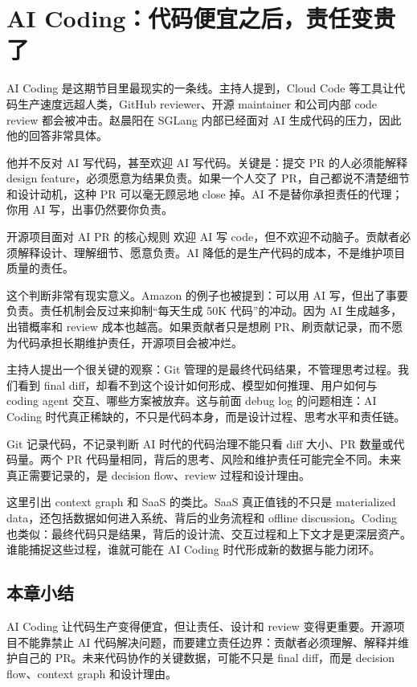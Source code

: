 \section{AI Coding：代码便宜之后，责任变贵了}

AI Coding 是这期节目里最现实的一条线。主持人提到，Cloud Code 等工具让代码生产速度远超人类，GitHub reviewer、开源 maintainer 和公司内部 code review 都会被冲击。赵晨阳在 SGLang 内部已经面对 AI 生成代码的压力，因此他的回答非常具体。

他并不反对 AI 写代码，甚至欢迎 AI 写代码。关键是：提交 PR 的人必须能解释 design feature，必须愿意为结果负责。如果一个人交了 PR，自己都说不清楚细节和设计动机，这种 PR 可以毫无顾忌地 close 掉。AI 不是替你承担责任的代理；你用 AI 写，出事仍然要你负责。

\begin{importantbox}{开源项目面对 AI PR 的核心规则}
欢迎 AI 写 code，但不欢迎不动脑子。贡献者必须解释设计、理解细节、愿意负责。AI 降低的是生产代码的成本，不是维护项目质量的责任。
\end{importantbox}

这个判断非常有现实意义。Amazon 的例子也被提到：可以用 AI 写，但出了事要负责。责任机制会反过来抑制“每天生成 50K 代码”的冲动。因为 AI 生成越多，出错概率和 review 成本也越高。如果贡献者只是想刷 PR、刷贡献记录，而不愿为代码承担长期维护责任，开源项目会被冲烂。

主持人提出一个很关键的观察：Git 管理的是最终代码结果，不管理思考过程。我们看到 final diff，却看不到这个设计如何形成、模型如何推理、用户如何与 coding agent 交互、哪些方案被放弃。这与前面 debug log 的问题相连：AI Coding 时代真正稀缺的，不只是代码本身，而是设计过程、思考水平和责任链。

\begin{warningbox}{Git 记录代码，不记录判断}
AI 时代的代码治理不能只看 diff 大小、PR 数量或代码量。两个 PR 代码量相同，背后的思考、风险和维护责任可能完全不同。未来真正需要记录的，是 decision flow、review 过程和设计理由。
\end{warningbox}

这里引出 context graph 和 SaaS 的类比。SaaS 真正值钱的不只是 materialized data，还包括数据如何进入系统、背后的业务流程和 offline discussion。Coding 也类似：最终代码只是结果，背后的设计流、交互过程和上下文才是更深层资产。谁能捕捉这些过程，谁就可能在 AI Coding 时代形成新的数据与能力闭环。

\subsection{本章小结}

AI Coding 让代码生产变得便宜，但让责任、设计和 review 变得更重要。开源项目不能靠禁止 AI 代码解决问题，而要建立责任边界：贡献者必须理解、解释并维护自己的 PR。未来代码协作的关键数据，可能不只是 final diff，而是 decision flow、context graph 和设计理由。

